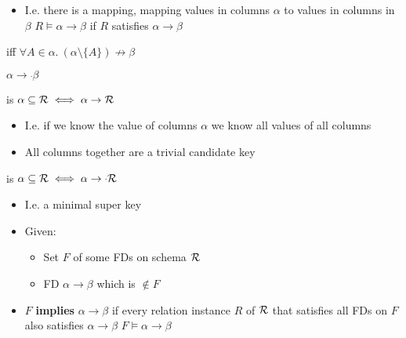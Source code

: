 \begin{itemize}
\begin{itemize}
\begin{itemize}
                        \item I.e. there is a mapping, mapping values in columns $\alpha$ to values in columns in $\beta$
                         $R \models \alpha \to \beta$ if $R$ satisfies $\alpha \to \beta$
                    \end{itemize}
        \end{itemize}
         iff $\forall A \in \alpha.\ (\alpha \setminus \{A\}) \not \to \beta$
            \begin{itemize}
                 $\alpha \to \overset{.}{} \beta$
            \end{itemize}
        \begin{itemize}
             is $\alpha \subseteq \mathcal{R} \iff \alpha \to \mathcal{R}$
                \begin{itemize}
                    \item I.e. if we know the value of columns $\alpha$ we know all values of all columns
                    \item All columns together are a trivial candidate key
                \end{itemize}
             is $\alpha \subseteq \mathcal{R} \iff \alpha \to \overset{.}{} \mathcal{R}$
                \begin{itemize}
                    \item I.e. a minimal super key
                \end{itemize}
        \end{itemize}
        \begin{itemize}
            \item Given:
                \begin{itemize}
                    \item Set $F$ of some FDs on schema $\mathcal{R}$
                    \item FD $\alpha \to \beta$ which is $\not\in F$
                \end{itemize}
            \item $F$ \textbf{implies} $\alpha \to \beta$ if every relation instance $R$ of $\mathcal{R}$ that satisfies all FDs on $F$ also satisfies $\alpha \to \beta$
             $F \models \alpha \to \beta$
        \end{itemize}
        \begin{itemize}

\end{itemize}
\end{itemize}
